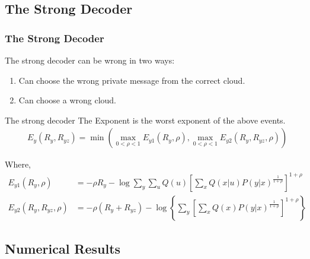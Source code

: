 \documentclass[mathserif]{beamer}
\newcommand{\lb}{\left(}
\newcommand{\rb}{\right)}
\begin{document}
\subsection{The Strong Decoder}
\begin{frame}
\frametitle{The Strong Decoder}
The strong decoder can be wrong in two ways:
\pause
\begin{enumerate}
    \item Can choose the wrong private message from the correct cloud.
    \pause
    \item Can choose a wrong cloud.
\end{enumerate}
\pause
\begin{block}{The strong decoder}
The Exponent is the worst exponent of the above events.
\begin{align*}
    &E_y(R_y, R_{yz}) = \min \lb \max_{0<\rho<1}E_{y1}(R_y, \rho),\max_{0<\rho<1}E_{y2}(R_y,R_{yz},\rho)\rb
\end{align*}
\end{block}
Where, \footnotesize
\begin{align*}
    E_{y1}(R_y,\rho) &=-\rho R_y -\log \sum_{y}\sum_{u}Q(u)\left[\sum_x Q(x|u)P(y|x)^{\frac 1 {1+\rho}}
        \right]^{1+\rho} \\
    E_{y2}(R_y,R_{yz},\rho) &= -\rho(R_y+R_{yz})-\log\left\{\sum_{y} \left[\sum_{x}Q(x)P(y|x)^{\frac 1 {1+\rho}}\right]^{1+\rho}\right\}
\end{align*}

\end{frame}

\subsection{Numerical Results}
\end{document}
